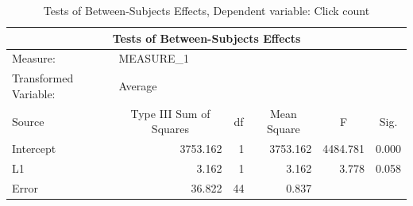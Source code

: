 \documentclass[a4paper]{article}
\begin{document}
\begin{table}[H]
\begin{center}
\caption{Tests of Between-Subjects Effects, Dependent variable: Click count}
\label{tab:betweenclickcount}
\begin{tabular}{|l|r|r|r|l|l|} 
\hline
\multicolumn{6}{|c|}{Tests of Between-Subjects Effects}                                                                                                                                          \\ 
\hline
Measure:~              & \multicolumn{1}{l|}{MEASURE\_1}              & \multicolumn{1}{l|}{}   & \multicolumn{1}{l|}{}            &                               &                             \\ 
\hline
Transformed Variable:~ & \multicolumn{1}{l|}{Average}                 & \multicolumn{1}{l|}{}   & \multicolumn{1}{l|}{}            &                               &                             \\ 
\hline
Source                 & \multicolumn{1}{c|}{Type III Sum of Squares} & \multicolumn{1}{c|}{df} & \multicolumn{1}{c|}{Mean Square} & \multicolumn{1}{c|}{F}        & \multicolumn{1}{c|}{Sig.}   \\ 
\hline
Intercept              & 3753.162                                     & 1                       & 3753.162                         & \multicolumn{1}{r|}{4484.781} & \multicolumn{1}{r|}{0.000}  \\ 
\hline
L1                     & 3.162                                        & 1                       & 3.162                            & \multicolumn{1}{r|}{3.778}    & \multicolumn{1}{r|}{0.058}  \\ 
\hline
Error                  & 36.822                                       & 44                      & 0.837                            & ~                             & ~                           \\
\hline
\end{tabular}
\end{center}
\end{table}

\end{document}

